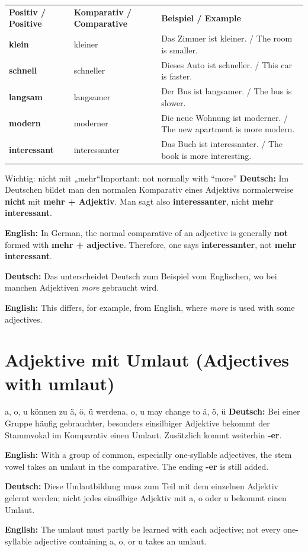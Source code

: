 \documentclass[a4paper,11pt]{article}
\newcommand{\GermanText}[1]{\textbf{Deutsch: }#1\par}
\newcommand{\EnglishText}[1]{{\small\color{SoftGray}\textbf{English: }#1\par}}
\begin{document}
\begin{longtable}{>{\bfseries}p{3.7cm}|p{4.2cm}|p{5.5cm}}
\rowcolor{HeaderBlueDark}
\color{white}\textbf{Positiv / Positive} &
\color{white}\textbf{Komparativ / Comparative} &
\color{white}\textbf{Beispiel / Example} \\
klein & kleiner & Das Zimmer ist kleiner. / The room is smaller. \\
schnell & schneller & Dieses Auto ist schneller. / This car is faster. \\
langsam & langsamer & Der Bus ist langsamer. / The bus is slower. \\
modern & moderner & Die neue Wohnung ist moderner. / The new apartment is more modern. \\
interessant & interessanter & Das Buch ist interessanter. / The book is more interesting. \\
\end{longtable}

\begin{grammarentry}{Wichtig: nicht mit „mehr“}{Important: not normally with “more”}
\GermanText{Im Deutschen bildet man den normalen Komparativ eines Adjektivs normalerweise \textbf{nicht} mit \textbf{mehr + Adjektiv}. Man sagt also \textbf{interessanter}, nicht \textbf{mehr interessant}.}
\EnglishText{In German, the normal comparative of an adjective is generally \textbf{not} formed with \textbf{mehr + adjective}. Therefore, one says \textbf{interessanter}, not \textbf{mehr interessant}.}

\GermanText{Das unterscheidet Deutsch zum Beispiel vom Englischen, wo bei manchen Adjektiven \textit{more} gebraucht wird.}
\EnglishText{This differs, for example, from English, where \textit{more} is used with some adjectives.}
\end{grammarentry}

\section{Adjektive mit Umlaut \textnormal{(Adjectives with umlaut)}}

\begin{grammarentry}{a, o, u können zu ä, ö, ü werden}{a, o, u may change to ä, ö, ü}
\GermanText{Bei einer Gruppe häufig gebrauchter, besonders einsilbiger Adjektive bekommt der Stammvokal im Komparativ einen Umlaut. Zusätzlich kommt weiterhin \textbf{-er}.}
\EnglishText{With a group of common, especially one-syllable adjectives, the stem vowel takes an umlaut in the comparative. The ending \textbf{-er} is still added.}

\GermanText{Diese Umlautbildung muss zum Teil mit dem einzelnen Adjektiv gelernt werden; nicht jedes einsilbige Adjektiv mit a, o oder u bekommt einen Umlaut.}
\EnglishText{The umlaut must partly be learned with each adjective; not every one-syllable adjective containing a, o, or u takes an umlaut.}
\end{grammarentry}
\end{document}
